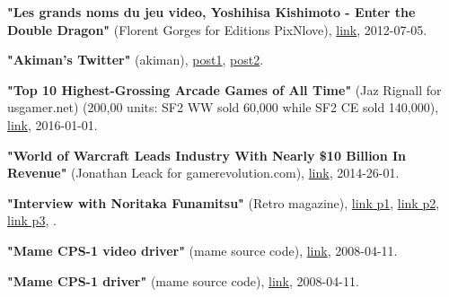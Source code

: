 \renewcommand{\bibname}{References}
\begin{thebibliography}{999}


  \textbf{ "Les grands noms du jeu video, Yoshihisa Kishimoto - Enter the Double Dragon"} (Florent Gorges for Editions PixNlove),
  \href{https://www.editionspixnlove.com/les-grands-noms-du-jeu-video/289-yoshihisa-kishimoto-enter-the-double-dragon.html}{link},
  2012-07-05.


  \textbf{ "Akiman's Twitter"} (akiman),
  \href{https://twitter.com/akiman7/status/465507673572519936}{post1},
  \href{https://twitter.com/akiman7/status/309615270815731712}{post2}.

  \textbf{ "Top 10 Highest-Grossing Arcade Games of All Time"} (Jaz Rignall for usgamer.net) (200,00 units: SF2 WW sold 60,000 while SF2 CE sold 140,000),
  \href{https://www.usgamer.net/articles/top-10-biggest-grossing-arcade-games-of-all-time}{link},
  2016-01-01.

  \textbf{ "World of Warcraft Leads Industry With Nearly \$10 Billion In Revenue"} (Jonathan Leack for gamerevolution.com),
  \href{https://www.gamerevolution.com/features/13510-world-of-warcraft-leads-industry-with-nearly-10-billion-in-revenue#/slide/1}{link},
  2014-26-01.
  
  \textbf{"Interview with Noritaka Funamitsu"} (Retro magazine),
  \href{http://fightingstreet.com/folders/variousinfofolder/interviewfolder/sfii_funamitsu/funamitsu1.jpg}{link p1},
  \href{http://fightingstreet.com/folders/variousinfofolder/interviewfolder/sfii_funamitsu/funamitsu2.jpg}{link p2},
  \href{http://fightingstreet.com/folders/variousinfofolder/interviewfolder/sfii_funamitsu/funamitsu3.jpg}{link p3},
  .

  \textbf{"Mame CPS-1 video driver"} (mame source code),
  \href{https://github.com/mamedev/mame/blob/e070405df99e6a5997d5a64ecd62e7161c729a9d/src/mame/video/cps1.cpp#L269}{link},
  2008-04-11.

  \textbf{"Mame CPS-1 driver"} (mame source code),
  \href{https://github.com/mamedev/mame/blob/e070405df99e6a5997d5a64ecd62e7161c729a9d/src/mame/drivers/cps1.cpp#L567}{link},
  2008-04-11.


\end{thebibliography}
